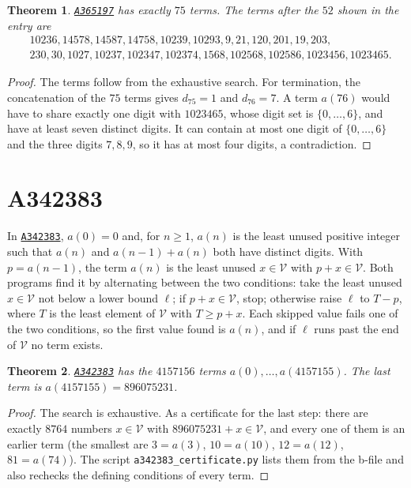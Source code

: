 \documentclass[11pt,a4paper]{article}
\newtheorem{theorem}{Theorem}
\theoremstyle{remark}
\newcommand{\oeis}[1]{\href{https://oeis.org/#1}{\texttt{#1}}}
\begin{document}
\begin{theorem}
\oeis{A365197} has exactly $75$ terms. The terms after the $52$ shown in the entry are
\[
\begin{aligned}
&10236, 14578, 14587, 14758, 10239, 10293, 9, 21, 120, 201, 19, 203,\\
&230, 30, 1027, 10237, 102347, 102374, 1568, 102568, 102586, 1023456, 1023465.
\end{aligned}
\]
\end{theorem}

\begin{proof}
The terms follow from the exhaustive search. For termination, the concatenation of the $75$ terms gives $d_{75}=1$ and $d_{76}=7$. A term $a(76)$ would have to share exactly one digit with $1023465$, whose digit set is $\{0,\dots,6\}$, and have at least seven distinct digits. It can contain at most one digit of $\{0,\dots,6\}$ and the three digits $7,8,9$, so it has at most four digits, a contradiction.
\end{proof}

\section{A342383}\label{sec:342383}

In \oeis{A342383}, $a(0)=0$ and, for $n\ge1$, $a(n)$ is the least unused positive integer such that $a(n)$ and $a(n-1)+a(n)$ both have distinct digits. With $p=a(n-1)$, the term $a(n)$ is the least unused $x\in\mathcal V$ with $p+x\in\mathcal V$. Both programs find it by alternating between the two conditions: take the least unused $x\in\mathcal V$ not below a lower bound $\ell$; if $p+x\in\mathcal V$, stop; otherwise raise $\ell$ to $T-p$, where $T$ is the least element of $\mathcal V$ with $T\ge p+x$. Each skipped value fails one of the two conditions, so the first value found is $a(n)$, and if $\ell$ runs past the end of $\mathcal V$ no term exists.

\begin{theorem}
\oeis{A342383} has the $4157156$ terms $a(0),\dots,a(4157155)$. The last term is $a(4157155)=896075231$.
\end{theorem}

\begin{proof}
The search is exhaustive. As a certificate for the last step: there are exactly $8764$ numbers $x\in\mathcal V$ with $896075231+x\in\mathcal V$, and every one of them is an earlier term (the smallest are $3=a(3)$, $10=a(10)$, $12=a(12)$, $81=a(74)$). The script \texttt{a342383\_certificate.py} lists them from the b-file and also rechecks the defining conditions of every term.
\end{proof}
\end{document}
